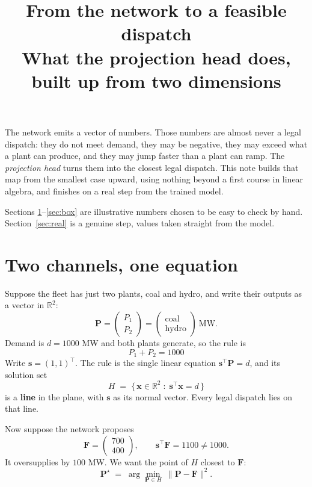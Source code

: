 \documentclass[11pt]{article}
\title{From the network to a feasible dispatch\\
\large What the projection head does, built up from two dimensions}
\author{}
\date{}
\newcommand{\s}{\mathbf{s}}
\newcommand{\F}{\mathbf{F}}
\newcommand{\Pv}{\mathbf{P}}
\newcommand{\R}{\mathbb{R}}
\begin{document}
\maketitle

\noindent
The network emits a vector of numbers. Those numbers are almost never a legal
dispatch: they do not meet demand, they may be negative, they may exceed what a
plant can produce, and they may jump faster than a plant can ramp. The
\emph{projection head} turns them into the closest legal dispatch. This note
builds that map from the smallest case upward, using nothing beyond a first
course in linear algebra, and finishes on a real step from the trained model.

Sections \ref{sec:two}--\ref{sec:box} are illustrative numbers chosen to be easy
to check by hand. Section~\ref{sec:real} is a genuine step, values taken
straight from the model.

\tableofcontents

\section{Two channels, one equation}
\label{sec:two}

Suppose the fleet has just two plants, coal and hydro, and write their outputs
as a vector in $\R^2$:
\[
  \Pv = \begin{pmatrix} P_1 \\ P_2 \end{pmatrix}
      = \begin{pmatrix} \text{coal} \\ \text{hydro}\end{pmatrix}\ \text{MW}.
\]
Demand is $d = 1000$ MW and both plants generate, so the rule is
\[
  \boxed{\;P_1 + P_2 = 1000\;}
\]
Write $\s = (1,1)^{\!\top}$. The rule is the single linear equation
$\s^{\!\top}\Pv = d$, and its solution set
\[
  H \;=\; \{\, \mathbf{x}\in\R^2 \;:\; \s^{\!\top}\mathbf{x} = d \,\}
\]
is a \textbf{line} in the plane, with $\s$ as its normal vector. Every legal
dispatch lies on that line.

Now suppose the network proposes
\[
  \F = \begin{pmatrix} 700 \\ 400 \end{pmatrix},
  \qquad \s^{\!\top}\F = 1100 \neq 1000 .
\]
It oversupplies by $100$ MW. We want the point of $H$ closest to $\F$:
\[
  \Pv^\star \;=\; \arg\min_{\Pv \in H} \ \lVert \Pv - \F \rVert^2 .
\]
\end{document}
